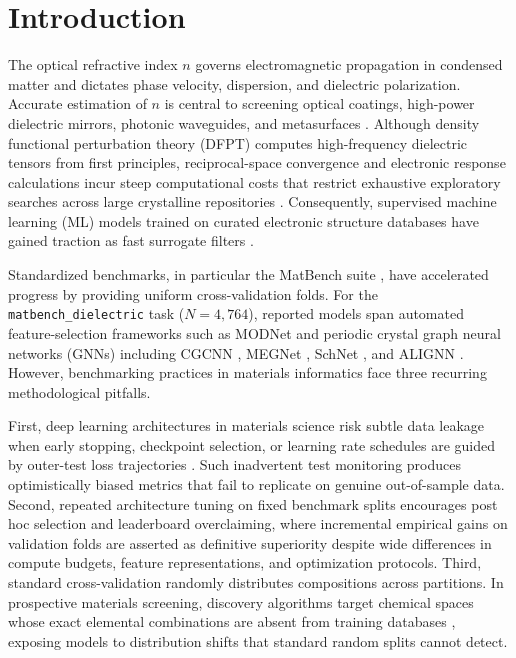 \documentclass[journal,article,submit,moreauthors,pdftex]{article}
\begin{document}
\section{Introduction}
The optical refractive index $n$ governs electromagnetic propagation in condensed matter and dictates phase velocity, dispersion, and dielectric polarization. Accurate estimation of $n$ is central to screening optical coatings, high-power dielectric mirrors, photonic waveguides, and metasurfaces \cite{petousis2017high, ramprasad2017machine, dunn2020benchmarking}. Although density functional perturbation theory (DFPT) computes high-frequency dielectric tensors from first principles, reciprocal-space convergence and electronic response calculations incur steep computational costs that restrict exhaustive exploratory searches across large crystalline repositories \cite{petousis2017high}. Consequently, supervised machine learning (ML) models trained on curated electronic structure databases have gained traction as fast surrogate filters \cite{ward2016general, xie2018crystal, chen2019graph}.

Standardized benchmarks, in particular the MatBench suite \cite{dunn2020benchmarking}, have accelerated progress by providing uniform cross-validation folds. For the \texttt{matbench\_dielectric} task ($N = 4{,}764$), reported models span automated feature-selection frameworks such as MODNet \cite{de2021robust} and periodic crystal graph neural networks (GNNs) including CGCNN \cite{xie2018crystal}, MEGNet \cite{chen2019graph}, SchNet \cite{schutt2017schnet}, and ALIGNN \cite{choudhary2021atomistic}. However, benchmarking practices in materials informatics face three recurring methodological pitfalls.

First, deep learning architectures in materials science risk subtle data leakage when early stopping, checkpoint selection, or learning rate schedules are guided by outer-test loss trajectories \cite{artrith2021best}. Such inadvertent test monitoring produces optimistically biased metrics that fail to replicate on genuine out-of-sample data. Second, repeated architecture tuning on fixed benchmark splits encourages post hoc selection and leaderboard overclaiming, where incremental empirical gains on validation folds are asserted as definitive superiority despite wide differences in compute budgets, feature representations, and optimization protocols. Third, standard cross-validation randomly distributes compositions across partitions. In prospective materials screening, discovery algorithms target chemical spaces whose exact elemental combinations are absent from training databases \cite{xiong2023evaluating}, exposing models to distribution shifts that standard random splits cannot detect.
\end{document}
